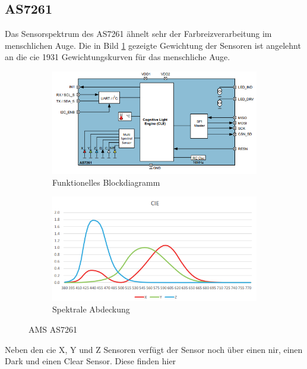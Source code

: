 \documentclass[11pt]{scrartcl}
\begin{document}
\subsection{AS7261}
Das Sensorspektrum des AS7261 ähnelt sehr der Farbreizverarbeitung im menschlichen Auge. Die in Bild \ref{fig:AS7261_spectrum} gezeigte
Gewichtung der Sensoren ist angelehnt an die \ac{cie} 1931 Gewichtungskurven für das menschliche Auge.
\begin{figure}[H]
    \centering
    \begin{subfigure}[b]{0.49\textwidth}
        \includegraphics[width=\textwidth]{images/AS7261_functional_blockdiagram.png}
        \caption{Funktionelles Blockdiagramm}
    \end{subfigure}
    \hfill 
    \begin{subfigure}[b]{0.49\textwidth}
        \includegraphics[width=\textwidth]{images/AS7261_spectrum.png}
        \caption{Spektrale Abdeckung}\label{fig:AS7261_spectrum}
    \end{subfigure}
    \caption[AMS AS7261]{AMS AS7261 \cite{datasheet61}}\label{fig:AS7261}
\end{figure}
\noindent
Neben den \ac{cie} X, Y und Z Sensoren verfügt der Sensor noch über einen \ac{nir}, einen Dark und einen Clear Sensor. Diese finden hier
\end{document}

